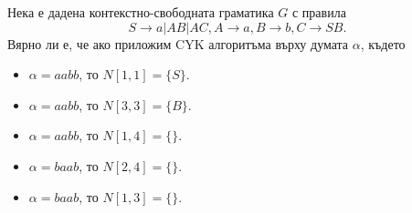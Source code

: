 Нека е дадена контекстно-свободната граматика $G$ с правила \[S\rightarrow a\vert AB \vert AC, A \rightarrow a, B\rightarrow b, C\rightarrow SB.\]
Вярно ли е, че ако приложим CYK алгоритъма върху думата $\alpha$, където
\begin{itemize}
\item 
  $\alpha = aabb$, то $N[1,1] = \{S\}$.
\item 
  $\alpha = aabb$, то $N[3,3] = \{B\}$.
\item 
  $\alpha = aabb$, то $N[1,4] = \{\}$.
\item
  $\alpha = baab$, то $N[2,4] = \{\}$.
\item
  $\alpha = baab$, то $N[1,3] = \{\}$.
\end{itemize}



